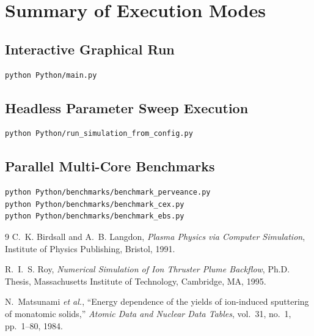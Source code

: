 \documentclass[11pt,a4paper]{article}
\begin{document}
\section{Summary of Execution Modes}

\subsection{Interactive Graphical Run}
\begin{lstlisting}[language=bash]
python Python/main.py
\end{lstlisting}

\subsection{Headless Parameter Sweep Execution}
\begin{lstlisting}[language=bash]
python Python/run_simulation_from_config.py
\end{lstlisting}

\subsection{Parallel Multi-Core Benchmarks}
\begin{lstlisting}[language=bash]
python Python/benchmarks/benchmark_perveance.py
python Python/benchmarks/benchmark_cex.py
python Python/benchmarks/benchmark_ebs.py
\end{lstlisting}

\begin{thebibliography}{9}
C.~K. Birdsall and A.~B. Langdon,
\textit{Plasma Physics via Computer Simulation},
Institute of Physics Publishing, Bristol, 1991.

R.~I.~S. Roy, \textit{Numerical Simulation of Ion Thruster Plume Backflow}, Ph.D. Thesis, Massachusetts Institute of Technology, Cambridge, MA, 1995.

N.~Matsunami \textit{et al.},
``Energy dependence of the yields of ion-induced sputtering of monatomic solids,'' \textit{Atomic Data and Nuclear Data Tables}, vol.~31, no.~1, pp.~1--80, 1984.
\end{thebibliography}
\end{document}
